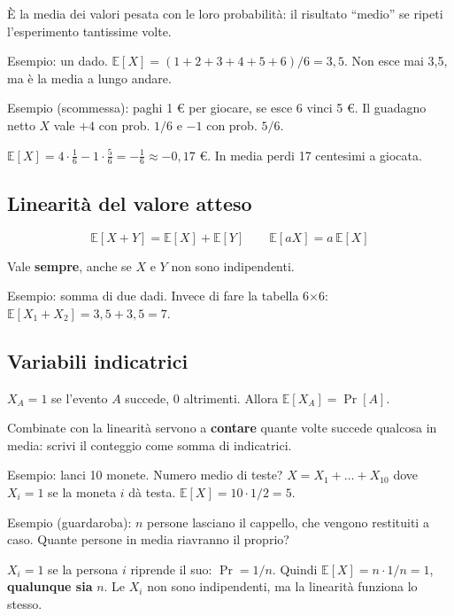 È la media dei valori pesata con le loro probabilità: il risultato ``medio'' se ripeti l'esperimento tantissime volte.

\begin{esempio}

Esempio: un dado. \(\mathbb{E}[X] = (1+2+3+4+5+6)/6 = 3{,}5\). Non esce mai 3,5, ma è la media a lungo andare.

Esempio (scommessa): paghi 1 € per giocare, se esce 6 vinci 5 €. Il guadagno netto \(X\) vale \(+4\) con prob. \(1/6\) e \(-1\) con prob. \(5/6\).

\(\mathbb{E}[X] = 4 \cdot \tfrac{1}{6} - 1 \cdot \tfrac{5}{6} = -\tfrac{1}{6} \approx -0{,}17\) €. In media perdi 17 centesimi a giocata.

\end{esempio}

\subsection{Linearità del valore atteso}

\[
\mathbb{E}[X + Y] = \mathbb{E}[X] + \mathbb{E}[Y] \qquad \mathbb{E}[aX] = a\,\mathbb{E}[X]
\]

Vale \textbf{sempre}, anche se \(X\) e \(Y\) non sono indipendenti.

\begin{esempio}

Esempio: somma di due dadi. Invece di fare la tabella 6×6: \(\mathbb{E}[X_1 + X_2] = 3{,}5 + 3{,}5 = 7\).

\end{esempio}

\subsection{Variabili indicatrici}

\(X_A = 1\) se l'evento \(A\) succede, \(0\) altrimenti. Allora \(\mathbb{E}[X_A] = \Pr[A]\).

Combinate con la linearità servono a \textbf{contare} quante volte succede qualcosa in media: scrivi il conteggio come somma di indicatrici.

\begin{esempio}

Esempio: lanci 10 monete. Numero medio di teste? \(X = X_1 + \dots + X_{10}\) dove \(X_i = 1\) se la moneta \(i\) dà testa. \(\mathbb{E}[X] = 10 \cdot 1/2 = 5\).

Esempio (guardaroba): \(n\) persone lasciano il cappello, che vengono restituiti a caso. Quante persone in media riavranno il proprio?

\(X_i = 1\) se la persona \(i\) riprende il suo: \(\Pr = 1/n\). Quindi \(\mathbb{E}[X] = n \cdot 1/n = 1\), \textbf{qualunque sia} \(n\). Le \(X_i\) non sono indipendenti, ma la linearità funziona lo stesso.

\end{esempio}

